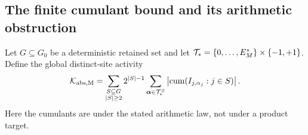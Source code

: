 \subsection{The finite cumulant bound and its arithmetic obstruction}\label{supp:palm:subsec:cumulants}
Let $G\subseteq G_0$ be a deterministic retained set and let $\mathcal T_*=\{0,\ldots,E_M^*\}\times\{-1,+1\}$. Define the global distinct-site activity
\begin{equation}\label{supp:palm:eq:absolute-activity}
 \mathcal K_{\rm abs,M}
 =\sum_{\substack{S\subseteq G\\|S|\ge2}}2^{|S|-1}
   \sum_{\boldsymbol\alpha\in\mathcal T_*^S}
       \left|\operatorname{cum}(I_{j,\alpha_j}:j\in S)\right|.
\end{equation}
Here the cumulants are under the stated arithmetic law, not under a product target.


